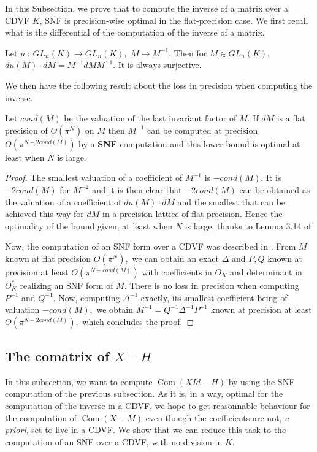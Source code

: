 \documentclass{sig-alternate-05-2015}
\DeclareMathOperator{\com}{Com}
\begin{document}
In this Subsection, we prove that to compute the inverse of
a matrix over a CDVF $K$, SNF is precision-wise optimal in the flat-precision case.
We first recall what is the differential of the computation of the inverse of a matrix.

\begin{lem}
Let $u \: : \: GL_n (K) \rightarrow GL_n(K),$ $M \mapsto M^{-1}.$
Then for $M \in GL_n (K),$ $du(M) \cdot dM=M^{-1} dM M^{-1}.$
It is always surjective.
\end{lem}

We then have the following result about the loss in precision when computing the inverse.

\begin{prop}
Let $cond(M)$ be the valuation of the last invariant factor of $M.$
If $dM$ is a flat precision of $O(\pi^N)$ on $M$ then $M^{-1}$
can be computed at precision $O(\pi^{N-2cond(M)})$ by a \textbf{SNF} computation
and this lower-bound is optimal
at least when $N$ is large.
\end{prop}
\begin{proof}
The smallest valuation of a coefficient of $M^{-1}$ is $-cond(M).$
It is $-2cond(M)$ for $M^{-2}$ and it is then clear that $-2cond(M)$
can be obtained as the valuation of a coefficient of $du(M) \cdot dM$
and the smallest that can be achieved this way for $dM$ in a precision lattice
of flat precision. Hence the optimality of the bound given, at least when 
$N$ is large, thanks to Lemma 3.14 of \cite{caruso-roe-vaccon:14a}

Now, the computation of an SNF form over a CDVF was described in \cite{Vaccon-these}.
From $M$ known at flat precision $O(\pi^N),$ we can obtain an exact $\Delta$ and $P,Q$ 
known at precision at least $O(\pi^{N-cond(M)})$ with coefficients in $O_K$
and determinant in $O_K^*$ realizing an SNF form of $M.$
There is no loss in precision when computing $P^{-1}$ and $Q^{-1}.$
Now, computing $\Delta^{-1}$ exactly, its smallest coefficient being  of valuation $-cond(M),$
we obtain $M^{-1}=Q^{-1} \Delta^{-1} P^{-1}$ known at precision at least $O(\pi^{N-2cond(M)}),$
which concludes the proof.
\end{proof}



\subsection{The comatrix of $X{-}H$}

In this subsection, we want to compute $\com (X Id -H)$
by using the SNF computation of the previous subsection.
As it is, in a way, optimal for the computation of the
inverse in a CDVF, we hope to get reasonnable behaviour
for the computation of $\com (X-M)$ even though the coefficients
are not, \textit{a priori}, set to live in a CDVF.
We show that we can reduce this task to the computation
of an SNF over a CDVF, with no division in $K.$
\end{document}
